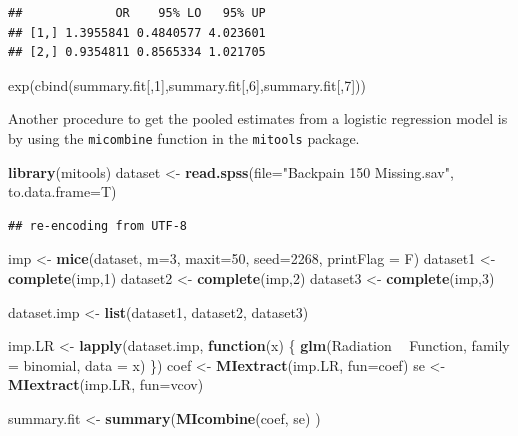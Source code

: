 \documentclass[]{book}
\newenvironment{Shaded}{\begin{snugshade}}{\end{snugshade}}
\newcommand{\KeywordTok}[1]{\textcolor[rgb]{0.13,0.29,0.53}{\textbf{#1}}}
\newcommand{\DataTypeTok}[1]{\textcolor[rgb]{0.13,0.29,0.53}{#1}}
\newcommand{\DecValTok}[1]{\textcolor[rgb]{0.00,0.00,0.81}{#1}}
\newcommand{\StringTok}[1]{\textcolor[rgb]{0.31,0.60,0.02}{#1}}
\newcommand{\ControlFlowTok}[1]{\textcolor[rgb]{0.13,0.29,0.53}{\textbf{#1}}}
\newcommand{\OperatorTok}[1]{\textcolor[rgb]{0.81,0.36,0.00}{\textbf{#1}}}
\newcommand{\NormalTok}[1]{#1}
\begin{document}
\begin{verbatim}
##             OR    95% LO   95% UP
## [1,] 1.3955841 0.4840577 4.023601
## [2,] 0.9354811 0.8565334 1.021705
\end{verbatim}

exp(cbind(summary.fit{[},1{]},summary.fit{[},6{]},summary.fit{[},7{]}))

Another procedure to get the pooled estimates from a logistic regression
model is by using the \texttt{micombine} function in the
\texttt{mitools} package.

\begin{Shaded}
\begin{Highlighting}[]
\KeywordTok{library}\NormalTok{(mitools)}
\NormalTok{dataset <-}\StringTok{ }\KeywordTok{read.spss}\NormalTok{(}\DataTypeTok{file=}\StringTok{"Backpain 150 Missing.sav"}\NormalTok{, }\DataTypeTok{to.data.frame=}\NormalTok{T)}
\end{Highlighting}
\end{Shaded}

\begin{verbatim}
## re-encoding from UTF-8
\end{verbatim}

\begin{Shaded}
\begin{Highlighting}[]
\NormalTok{imp <-}\StringTok{ }\KeywordTok{mice}\NormalTok{(dataset, }\DataTypeTok{m=}\DecValTok{3}\NormalTok{, }\DataTypeTok{maxit=}\DecValTok{50}\NormalTok{, }\DataTypeTok{seed=}\DecValTok{2268}\NormalTok{, }\DataTypeTok{printFlag =}\NormalTok{ F)}
\NormalTok{dataset1 <-}\StringTok{ }\KeywordTok{complete}\NormalTok{(imp,}\DecValTok{1}\NormalTok{)}
\NormalTok{dataset2 <-}\StringTok{ }\KeywordTok{complete}\NormalTok{(imp,}\DecValTok{2}\NormalTok{)}
\NormalTok{dataset3 <-}\StringTok{ }\KeywordTok{complete}\NormalTok{(imp,}\DecValTok{3}\NormalTok{)}
 
\NormalTok{dataset.imp <-}\StringTok{ }\KeywordTok{list}\NormalTok{(dataset1, dataset2, dataset3)}
 
\NormalTok{imp.LR <-}\StringTok{ }\KeywordTok{lapply}\NormalTok{(dataset.imp, }\ControlFlowTok{function}\NormalTok{(x) \{}
   \KeywordTok{glm}\NormalTok{(Radiation }\OperatorTok{~}\StringTok{ }\NormalTok{Function, }\DataTypeTok{family =}\NormalTok{ binomial, }\DataTypeTok{data =}\NormalTok{ x)}
\NormalTok{  \})}
\NormalTok{coef <-}\StringTok{ }\KeywordTok{MIextract}\NormalTok{(imp.LR, }\DataTypeTok{fun=}\NormalTok{coef) }
\NormalTok{se <-}\StringTok{ }\KeywordTok{MIextract}\NormalTok{(imp.LR, }\DataTypeTok{fun=}\NormalTok{vcov) }
 
\NormalTok{summary.fit <-}\StringTok{ }\KeywordTok{summary}\NormalTok{(}\KeywordTok{MIcombine}\NormalTok{(coef, se) )}
\end{Highlighting}
\end{Shaded}
\end{document}

